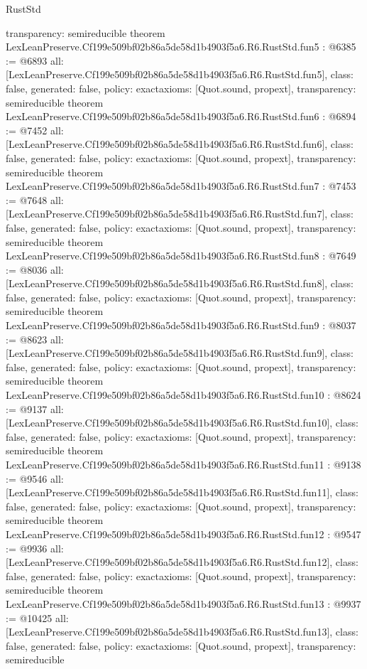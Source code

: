 \begin{lexlean}{RustStd}
\begin{coremodule}
{  transparency: semireducible
}
theorem LexLeanPreserve.Cf199e509bf02b86a5de58d1b4903f5a6.R6.RustStd.fun5 : @6385 := @6893 {
  all: [LexLeanPreserve.Cf199e509bf02b86a5de58d1b4903f5a6.R6.RustStd.fun5],
  class: false,
  generated: false,
  policy: exact{axioms: [Quot.sound, propext]},
  transparency: semireducible
}
theorem LexLeanPreserve.Cf199e509bf02b86a5de58d1b4903f5a6.R6.RustStd.fun6 : @6894 := @7452 {
  all: [LexLeanPreserve.Cf199e509bf02b86a5de58d1b4903f5a6.R6.RustStd.fun6],
  class: false,
  generated: false,
  policy: exact{axioms: [Quot.sound, propext]},
  transparency: semireducible
}
theorem LexLeanPreserve.Cf199e509bf02b86a5de58d1b4903f5a6.R6.RustStd.fun7 : @7453 := @7648 {
  all: [LexLeanPreserve.Cf199e509bf02b86a5de58d1b4903f5a6.R6.RustStd.fun7],
  class: false,
  generated: false,
  policy: exact{axioms: [Quot.sound, propext]},
  transparency: semireducible
}
theorem LexLeanPreserve.Cf199e509bf02b86a5de58d1b4903f5a6.R6.RustStd.fun8 : @7649 := @8036 {
  all: [LexLeanPreserve.Cf199e509bf02b86a5de58d1b4903f5a6.R6.RustStd.fun8],
  class: false,
  generated: false,
  policy: exact{axioms: [Quot.sound, propext]},
  transparency: semireducible
}
theorem LexLeanPreserve.Cf199e509bf02b86a5de58d1b4903f5a6.R6.RustStd.fun9 : @8037 := @8623 {
  all: [LexLeanPreserve.Cf199e509bf02b86a5de58d1b4903f5a6.R6.RustStd.fun9],
  class: false,
  generated: false,
  policy: exact{axioms: [Quot.sound, propext]},
  transparency: semireducible
}
theorem LexLeanPreserve.Cf199e509bf02b86a5de58d1b4903f5a6.R6.RustStd.fun10 : @8624 := @9137 {
  all: [LexLeanPreserve.Cf199e509bf02b86a5de58d1b4903f5a6.R6.RustStd.fun10],
  class: false,
  generated: false,
  policy: exact{axioms: [Quot.sound, propext]},
  transparency: semireducible
}
theorem LexLeanPreserve.Cf199e509bf02b86a5de58d1b4903f5a6.R6.RustStd.fun11 : @9138 := @9546 {
  all: [LexLeanPreserve.Cf199e509bf02b86a5de58d1b4903f5a6.R6.RustStd.fun11],
  class: false,
  generated: false,
  policy: exact{axioms: [Quot.sound, propext]},
  transparency: semireducible
}
theorem LexLeanPreserve.Cf199e509bf02b86a5de58d1b4903f5a6.R6.RustStd.fun12 : @9547 := @9936 {
  all: [LexLeanPreserve.Cf199e509bf02b86a5de58d1b4903f5a6.R6.RustStd.fun12],
  class: false,
  generated: false,
  policy: exact{axioms: [Quot.sound, propext]},
  transparency: semireducible
}
theorem LexLeanPreserve.Cf199e509bf02b86a5de58d1b4903f5a6.R6.RustStd.fun13 : @9937 := @10425 {
  all: [LexLeanPreserve.Cf199e509bf02b86a5de58d1b4903f5a6.R6.RustStd.fun13],
  class: false,
  generated: false,
  policy: exact{axioms: [Quot.sound, propext]},
  transparency: semireducible
}
\end{coremodule}
\end{lexlean}

